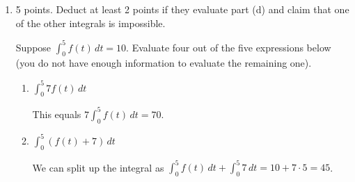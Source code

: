 \documentclass{article}
\begin{document}
\begin{enumerate}
\begin{enumerate}
      \begin{solution}
        We can rewrite this as
        \begin{align*}
          \int_{-1}^1 \left( 2\sqrt{1-x^2} + 7 \right) dx &= \int_{-1}^1 2
          \sqrt{1 - x^2}\,dx + \int_{-1}^1 7\,dx \\
          &= 2 \int_{-1}^1 \sqrt{1 - x^2}\,dx + \int_{-1}^1 7\,dx \\
          \intertext{We can visualize the integrals $\displaystyle
            \int_{-1}^1 \sqrt{1 - x^2}\,dx$ and $\displaystyle \int_{-1}^1
            7\,dx$ as signed area (remember that $y = \sqrt{1 - x^2}$ is
            the equation of the top half of the circle with radius 1 whose
            center is the origin), to figure out that:}
          &= 2 \left( \frac{1}{2} \pi \right) + 14 \\
          &= \boxed{\pi + 14}
        \end{align*}
      \end{solution}
    \end{enumerate}
    \probonly{}

\item 
\begin{grading}
5 points. Deduct at least 2 points if they evaluate part (d) and claim that one of the other integrals is impossible.
\end{grading}

Suppose $\displaystyle \int_{0}^{5} f(t)\,dt =10$. Evaluate four out
    of the five expressions below (you do not have enough information to
    evaluate the remaining one).

    \probonly{ \raggedcolumns}
      \begin{enumerate}
      \item
        \begin{problem}[\vfill]
          $\displaystyle \int_{0}^{5}7f(t)\,dt$
        \end{problem}

        \begin{solution} %
          This equals $\displaystyle 7 \int_0^5 f(t) \, dt = \boxed{70}$.
        \end{solution}

      \item
        \begin{problem}[\vfill]
          $\displaystyle \int_{0}^{5}\left(f(t)+7 \right)\,dt$
        \end{problem}

        \begin{solution} %
          We can split up the integral as $\displaystyle \int_0^5 f(t)
          \, dt + \int_0^5 7 \, dt = 10 + 7 \cdot 5 = \boxed{45}$.


\end{solution}
\end{enumerate}
\end{enumerate}
\end{document}
